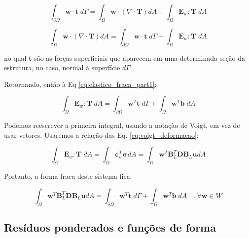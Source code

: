         \begin{equation*}
            \int_{\partial \Omega} \mathbf{w} \cdot \mathbf{t} \; d\Gamma = 
            \int_\Omega \mathbf{w} \cdot \left(\nabla \cdot \mathbf{T}\right)dA +
            \int_\Omega \mathbf{E}_w : \mathbf{T} \; dA
        \end{equation*}

        \begin{equation}
            \int_\Omega \mathbf{w} \cdot \left(\nabla \cdot \mathbf{T}\right)dA = 
            \int_{\partial \Omega} \mathbf{w} \cdot \mathbf{t} \; d\Gamma -
            \int_\Omega \mathbf{E}_w : \mathbf{T} \; dA
        \end{equation}

        \noindent no qual $\mathbf{t}$ são as forças superficiais que aparecem em uma determinada seção da estrutura, no caso, normal à superfície $d\Gamma$.

        Retornando, então à Eq \eqref{eq:elastico_fraca_part1}:

        \begin{equation}
            \int_\Omega \mathbf{E}_w : \mathbf{T} \; dA = \int_{\partial \Omega} \mathbf{w}^T \mathbf{t} \; d\Gamma + \int_\Omega \mathbf{w}^T \mathbf{b} \; dA
            \label{eq:elastico_fraca_part2}
        \end{equation}

        Podemos reescrever a primeira integral, usando a notação de Voigt, em vez de usar vetores. Usaremos a relação das Eq. \eqref{eq:voigt_deformacao}:

        \begin{equation}
            \int_\Omega \mathbf{E}_w : \mathbf{T} \; dA = \int_\Omega \bm{\varepsilon}_w^T \bm{\sigma} dA =  \int_\Omega \mathbf{w}^T \mathbf{B}_L^T \mathbf{D} \mathbf{B}_L \mathbf{u} dA
        \end{equation}

        Portanto, a forma fraca deste sistema fica:

        \begin{equation}
            \int_\Omega \mathbf{w}^T \mathbf{B}_L^T \mathbf{D} \mathbf{B}_L \mathbf{u} dA = \int_{\partial \Omega} \mathbf{w}^T \mathbf{t} \; d\Gamma + \int_\Omega \mathbf{w}^T \mathbf{b} \; dA \quad, \forall \mathbf{w} \in W
            \label{eq:elastico_fraca}
        \end{equation}

    \subsection{Resíduos ponderados e funções de forma}

